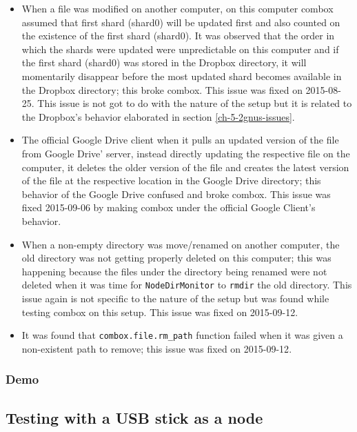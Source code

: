 \begin{itemize}
\item When a file was modified on another computer, on this computer
  combox assumed that first shard (shard0) will be updated first and
  also counted on the existence of the first shard (shard0). It was
  observed that the order in which the shards were updated were
  unpredictable on this computer and if the first shard (shard0) was
  stored in the Dropbox directory, it will momentarily disappear
  before the most updated shard becomes available in the Dropbox
  directory; this broke combox. This issue was fixed on
  2015-08-25\cite{git:bug-four-fix}. This issue is not got to do with
  the nature of the setup but it is related to the Dropbox's behavior
  elaborated in section \ref{ch-5-2gnus-issues}.
\item The official Google Drive client when it pulls an updated
  version of the file from Google Drive' server, instead directly
  updating the respective file on the computer, it deletes the older
  version of the file and creates the latest version of the file at
  the respective location in the Google Drive directory; this behavior
  of the Google Drive confused and broke combox. This issue was fixed
  2015-09-06 by making combox under the official Google Client's
  behavior\cite{git:bug-googledc-fix}.
\item When a non-empty directory was move/renamed on another computer,
  the old directory was not getting properly deleted on this computer;
  this was happening because the files under the directory being
  renamed were not deleted when it was time for \verb+NodeDirMonitor+
  to \verb+rmdir+ the old directory. This issue again is not specific
  to the nature of the setup but was found while testing combox on
  this setup. This issue was fixed on
  2015-09-12\cite{git:bug-six-fix}.
\item It was found that \verb+combox.file.rm_path+ function failed
  when it was given a non-existent path to remove; this issue was
  fixed on 2015-09-12\cite{git:bug-seven-fix}.
\end{itemize}
\subsubsection{Demo}
\subsection{Testing with a USB stick as a node}

